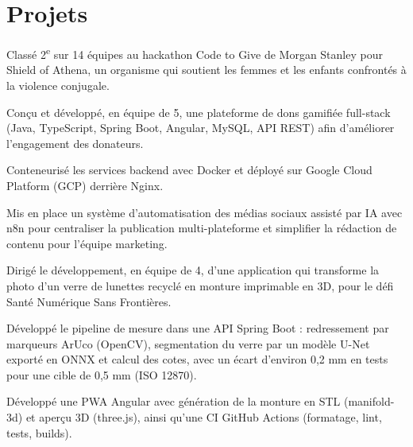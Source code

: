 \documentclass[letterpaper,10pt]{article}
\begin{document}
\section{Projets}

\begin{resume_list}
\item Classé 2\textsuperscript{e} sur 14 équipes au hackathon Code to Give de Morgan Stanley pour Shield of Athena, un organisme qui soutient les femmes et les enfants confrontés à la violence conjugale.
\item Conçu et développé, en équipe de 5, une plateforme de dons gamifiée full-stack (Java, TypeScript, Spring Boot, Angular, MySQL, API REST) afin d'améliorer l'engagement des donateurs.
\item Conteneurisé les services backend avec Docker et déployé sur Google Cloud Platform (GCP) derrière Nginx.
\item Mis en place un système d'automatisation des médias sociaux assisté par IA avec n8n pour centraliser la publication multi-plateforme et simplifier la rédaction de contenu pour l'équipe marketing.
\end{resume_list}

\newpage

\begin{resume_list}
\item Dirigé le développement, en équipe de 4, d'une application qui transforme la photo d'un verre de lunettes recyclé en monture imprimable en 3D, pour le défi Santé Numérique Sans Frontières.
\item Développé le pipeline de mesure dans une API Spring Boot : redressement par marqueurs ArUco (OpenCV), segmentation du verre par un modèle U-Net exporté en ONNX et calcul des cotes, avec un écart d'environ 0,2 mm en tests pour une cible de 0,5 mm (ISO 12870).
\item Développé une PWA Angular avec génération de la monture en STL (manifold-3d) et aperçu 3D (three.js), ainsi qu'une CI GitHub Actions (formatage, lint, tests, builds).
\end{resume_list}
\end{document}
